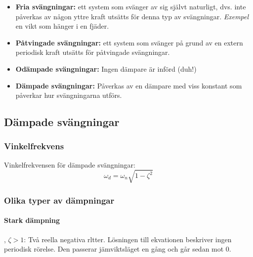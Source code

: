 \documentclass{article}
\newenvironment{ankiflashcard}[1]{}{}
\begin{document}
\begin{paracol}{2}
\begin{ankiflashcard}{Förklara vad dämpade och odämpade svängningar är samt vad fria och påtvingade svängningar är för något.}
\begin{itemize}
    \item \textbf{Fria svängningar: } ett system som svänger av sig självt naturligt, dvs. inte påverkas av någon yttre kraft utsätts för denna typ av svängningar.
    \textit{Exempel} en vikt som hänger i en fjäder.
    \item \textbf{Påtvingade svängningar: } ett system som svänger på grund av en extern periodisk kraft utsätts för påtvingade svängningar.
    \item \textbf{Odämpade svängningar: } Ingen dämpare är införd (duh!)
    \item \textbf{Dämpade svängningar: } Påverkas av en dämpare med viss konstant som påverkar hur svängningarna utförs.
\end{itemize}
\end{ankiflashcard}
\subsection{Dämpade svängningar}
\subsubsection{Vinkelfrekvens}

\begin{ankiflashcard}{Definiera vinkelfrekvens för dämpade svängningar}
    
Vinkelfrekvensen för dämpade svängningar: $$\omega_d = \omega_n \sqrt{1-\zeta^2}$$
\end{ankiflashcard}
\subsubsection{Olika typer av dämpningar}

\begin{ankiflashcard}{Definiera de olika typerna av dämpning. Ange hur de beter sig samt vad för typ av rötter de är kopplade till.}
    
\paragraph{\color{red}Stark\color{black}  \quad dämpning}, $\zeta > 1$:
Två reella negativa rltter.
Lösningen till ekvationen beskriver ingen periodisk rörelse. 
Den passerar jämviktsläget en gång och går sedan mot 0.



\end{ankiflashcard}
\end{paracol}
\end{document}
